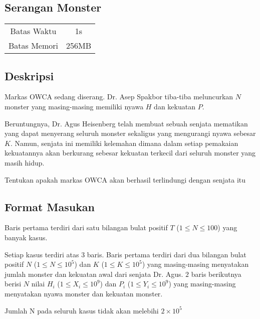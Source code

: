 \documentclass{article}
\begin{document}
\begin{center}

    
    \section*{Serangan Monster} %

    \begin{tabular}{ | c c | }
        \hline
        Batas Waktu  & 1s \\    %
        Batas Memori & 256MB \\  %
        \hline
    \end{tabular}
\end{center}

\subsection*{Deskripsi}

Markas OWCA sedang diserang. Dr. Asep Spakbor tiba-tiba meluncurkan $N$ monster yang masing-masing memiliki nyawa $H$ dan kekuatan $P$.

Beruntungnya, Dr. Agus Heisenberg telah membuat sebuah senjata mematikan yang dapat menyerang seluruh monster sekaligus yang mengurangi nyawa sebesar $K$. Namun, senjata ini memiliki kelemahan dimana dalam setiap pemakaian kekuatannya akan berkurang sebesar kekuatan terkecil dari seluruh monster yang masih hidup.

Tentukan apakah markas OWCA akan berhasil terlindungi dengan senjata itu

\subsection*{Format Masukan}

Baris pertama terdiri dari satu bilangan bulat positif $T$ ($1 \leq N \leq 100$)  yang banyak kasus.

Setiap kasus terdiri atas 3 baris. Baris pertama terdiri dari dua bilangan bulat positif $N$ ($1 \leq N \leq 10^{5}$) dan $K$ ($1 \leq K \leq 10^{5}$) yang masing-masing menyatakan jumlah monster dan kekuatan awal dari senjata Dr. Agus.
$2$ baris berikutnya berisi $N$ nilai $H_i$ ($1 \leq X_i \leq 10^{9}$) dan $P_i$ ($1 \leq Y_i \leq 10^{9}$) yang masing-masing menyatakan nyawa monster dan kekuatan monster.

Jumlah N pada seluruh kasus tidak akan melebihi $2 \times 10^5$
\end{document}
